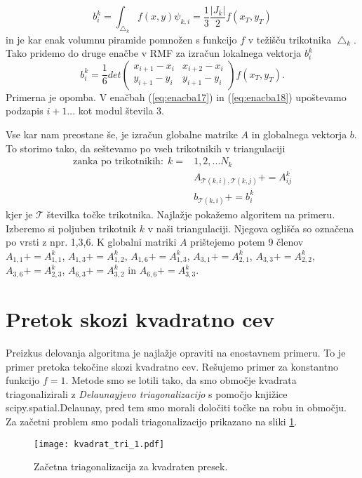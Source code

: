 \documentclass[12pt,a4paper]{article}
\begin{document}
\begin{equation*}
b^{k}_i= \int _{\bigtriangleup _k} f(x,y) \psi_{k,i}=\frac{1}{3} \frac{|J_k|}{2}f(x_T, y_T) 
\end{equation*}
in je kar enak volumnu piramide pomnožen s funkcijo $f$ v težišču trikotnika $\bigtriangleup _k$. Tako pridemo do druge enačbe v RMF za izračun lokalnega vektorja $b^{k}_i$
\begin{equation}\label{eq:enacba18}
b^{k}_i= \frac{1}{6} det
\begin{pmatrix}
 x_{i+1} - x_i& x_{i+2} - x_i \\
 y_{i+1} -y_i& y_{i+1} - y_i
\end{pmatrix}
f(x_T,y_T).
\end{equation}
Primerna je opomba. V enačbah (\ref{eq:enacba17}) in (\ref{eq:enacba18}) upoštevamo podzapis $i+1...$ kot modul števila 3.

Vse kar nam preostane še, je izračun globalne matrike $A$ in globalnega vektorja $b$. To storimo tako, da seštevamo po vseh trikotnikih v triangulaciji
\begin{align*}
\textrm{zanka po trikotnikih:} \ \ k=& 1,2,...N_k \\
& A_{\mathcal{T}(k,i), \mathcal{T}(k,j)} += A^{k} _{ij} \\
& b_{\mathcal{T}(k,i)}+=b^{k}_i
\end{align*}
kjer je $\mathcal{T}$ številka točke trikotnika.
Najlažje pokažemo algoritem na primeru. Izberemo si poljuben trikotnik $k$ v naši triangulaciji. Njegova oglišča so označena po vrsti z npr. 1,3,6. K globalni matriki $A$ prištejemo potem 9 členov $A_{1,1}+=A^{k}_{1,1}$, $A_{1,3} += A^{k}_{1,2}$, $A_{1,6}+=A^{k}_{1,3}$, $A_{3,1}+=A^{k}_{2,1}$, $A_{3,3}+=A^{k}_{2,2}$, $A_{3,6}+=A^{k}_{2,3}$, $A_{6,3}+=A^{k}_{3,2}$ in $A_{6,6}+=A^{k}_{3,3}$.

\section*{Pretok skozi kvadratno cev}

Preizkus delovanja algoritma je najlažje opraviti na enostavnem primeru. To je primer pretoka tekočine skozi kvadratno cev. Rešujemo primer za konstantno funkcijo $f=1$. Metode smo se lotili tako, da smo območje kvadrata triagonalizirali z \textit{Delaunayjevo triagonalizacijo} s pomočjo knjižice \textsf{scipy.spatial.Delaunay}, pred tem smo morali določiti točke na robu in območju. Za začetni problem smo podali triagonalizacijo prikazano na sliki \ref{fig:slika3}.
\begin{figure}[H]
\begin{center}
\texttt{[image: kvadrat\_tri\_1.pdf]}
\caption{Začetna triagonalizacija za kvadraten presek.} \label{fig:slika3}
\end{center}
\end{figure} 
\end{document}
